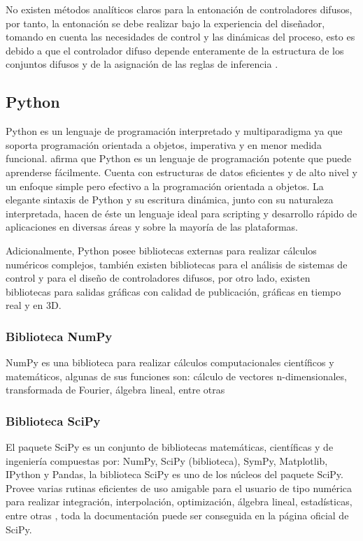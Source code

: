             No existen métodos analíticos claros para la entonación de controladores difusos, por tanto, la entonación se debe realizar bajo la experiencia del diseñador, tomando en cuenta las necesidades de control y las dinámicas del proceso, esto es debido a que el controlador difuso depende enteramente de la estructura de los conjuntos difusos y de la asignación de las reglas de inferencia \Parencite{cruz2010inteligencia}.
        
    \subsection{Python}
        
        Python es un lenguaje de programación interpretado y multiparadigma ya que soporta programación orientada a objetos, imperativa y en menor medida funcional. \textcite{guido2017tutorial} afirma que Python es un lenguaje de programación potente que puede aprenderse fácilmente. Cuenta con estructuras de datos eficientes y de alto
        nivel y un enfoque simple pero efectivo a la programación orientada a objetos. La elegante sintaxis de Python y su escritura
        dinámica, junto con su naturaleza interpretada, hacen de éste un lenguaje ideal para scripting y desarrollo rápido de
        aplicaciones en diversas áreas y sobre la mayoría de las plataformas.
        
        Adicionalmente, Python posee bibliotecas externas para realizar cálculos numéricos complejos, también existen bibliotecas para el análisis de sistemas de control y para el diseño de controladores difusos, por otro lado, existen bibliotecas para salidas gráficas con calidad de publicación, gráficas en tiempo real y en 3D.
        
        \subsubsection{Biblioteca NumPy}

            NumPy es una biblioteca para realizar cálculos computacionales científicos y matemáticos, algunas de sus funciones son: cálculo de vectores n-dimensionales, transformada de Fourier, álgebra lineal, entre otras \Parencite{numpy}

        \subsubsection{Biblioteca SciPy}	

            El paquete SciPy es un conjunto de bibliotecas matemáticas, científicas y de ingeniería compuestas por: NumPy, SciPy (biblioteca), SymPy, Matplotlib, IPython y Pandas, la biblioteca SciPy es uno de los núcleos del paquete SciPy. Provee varias rutinas eficientes de uso amigable para el usuario de tipo numérica para realizar integración, interpolación, optimización, álgebra lineal, estadísticas, entre otras \Parencite{scipy}, toda la documentación puede ser conseguida en la página oficial de SciPy.
            
